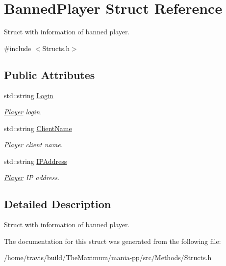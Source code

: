 \hypertarget{structBannedPlayer}{\section{Banned\-Player Struct Reference}
\label{structBannedPlayer}
}


Struct with information of banned player.  




{\ttfamily \#include $<$Structs.\-h$>$}

\subsection*{Public Attributes}
\begin{DoxyCompactItemize}
\item 
\hypertarget{structBannedPlayer_a2b4a31c68b935a9c3745c3e535daacc4}{std\-::string \hyperlink{structBannedPlayer_a2b4a31c68b935a9c3745c3e535daacc4}{Login}}\label{structBannedPlayer_a2b4a31c68b935a9c3745c3e535daacc4}

\begin{DoxyCompactList}\small\item\em \hyperlink{structPlayer}{Player} login. \end{DoxyCompactList}\item 
\hypertarget{structBannedPlayer_ac0b15d071d1f4987b28e17ca4734048a}{std\-::string \hyperlink{structBannedPlayer_ac0b15d071d1f4987b28e17ca4734048a}{Client\-Name}}\label{structBannedPlayer_ac0b15d071d1f4987b28e17ca4734048a}

\begin{DoxyCompactList}\small\item\em \hyperlink{structPlayer}{Player} client name. \end{DoxyCompactList}\item 
\hypertarget{structBannedPlayer_aabfb374d31b035f99be879642f737f9d}{std\-::string \hyperlink{structBannedPlayer_aabfb374d31b035f99be879642f737f9d}{I\-P\-Address}}\label{structBannedPlayer_aabfb374d31b035f99be879642f737f9d}

\begin{DoxyCompactList}\small\item\em \hyperlink{structPlayer}{Player} I\-P address. \end{DoxyCompactList}\end{DoxyCompactItemize}


\subsection{Detailed Description}
Struct with information of banned player. 

The documentation for this struct was generated from the following file\-:\begin{DoxyCompactItemize}
\item 
/home/travis/build/\-The\-Maximum/mania-\/pp/src/\-Methods/Structs.\-h\end{DoxyCompactItemize}
